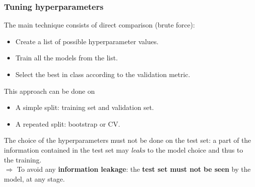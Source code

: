 \begin{frame}
\frametitle{Tuning hyperparameters}
The main technique consists of direct comparison (brute force):
\begin{itemize}
\item Create a list of possible hyperparameter values. 
\item Train all the models from the list.
\item Select the best in class according to the validation metric.
\end{itemize}
This approach can be done on
\begin{itemize}
\item A simple split: training set and validation set.
\item A repeated split: bootstrap or CV.
\end{itemize}
The choice of the hyperparameters must not be done on the test set: a part of the information contained in the test set may {\it leaks} to the model choice and thus to the training.\\ 
\vspace{0.2cm}
$\Rightarrow$ To avoid any {\bf information leakage}: the {\bf test set must not be seen} by the model, at any stage.
\end{frame}
